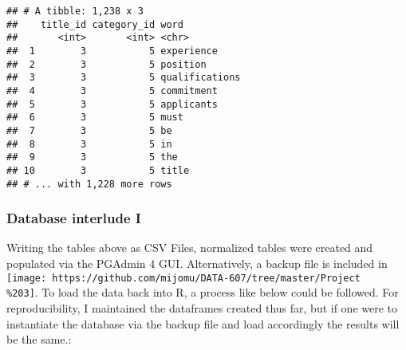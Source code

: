 \documentclass[]{article}
\newenvironment{Shaded}{\begin{snugshade}}{\end{snugshade}}
\newcommand{\KeywordTok}[1]{\textcolor[rgb]{0.13,0.29,0.53}{\textbf{#1}}}
\newcommand{\NormalTok}[1]{#1}
\newcommand{\OperatorTok}[1]{\textcolor[rgb]{0.81,0.36,0.00}{\textbf{#1}}}
\newcommand{\StringTok}[1]{\textcolor[rgb]{0.31,0.60,0.02}{#1}}
\begin{document}
\begin{Shaded}
\end{Shaded}

\begin{verbatim}
## # A tibble: 1,238 x 3
##    title_id category_id word          
##       <int>       <int> <chr>         
##  1        3           5 experience    
##  2        3           5 position      
##  3        3           5 qualifications
##  4        3           5 commitment    
##  5        3           5 applicants    
##  6        3           5 must          
##  7        3           5 be            
##  8        3           5 in            
##  9        3           5 the           
## 10        3           5 title         
## # ... with 1,228 more rows
\end{verbatim}

\hypertarget{database-interlude-i}{%
\subsubsection{Database interlude I}\label{database-interlude-i}}

Writing the tables above as CSV Files, normalized tables were created
and populated via the PGAdmin 4 GUI. Alternatively, a backup file is
included in
\texttt{[image: https://github.com/mijomu/DATA-607/tree/master/Project\\\%203]}.
To load the data back into R, a process like below could be followed.
For reproducibility, I maintained the dataframes created thus far, but
if one were to instantiate the database via the backup file and load
accordingly the results will be the same.:
\end{document}
